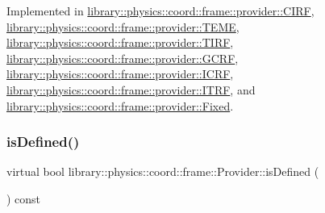 Implemented in \hyperlink{classlibrary_1_1physics_1_1coord_1_1frame_1_1provider_1_1_c_i_r_f_afa16d0f890856396364443239ceac509}{library\+::physics\+::coord\+::frame\+::provider\+::\+C\+I\+RF}, \hyperlink{classlibrary_1_1physics_1_1coord_1_1frame_1_1provider_1_1_t_e_m_e_a78bd46fa8118d7220ab16a4ca2195299}{library\+::physics\+::coord\+::frame\+::provider\+::\+T\+E\+ME}, \hyperlink{classlibrary_1_1physics_1_1coord_1_1frame_1_1provider_1_1_t_i_r_f_a89eea1b9ff4b38937bf51099e8dd6333}{library\+::physics\+::coord\+::frame\+::provider\+::\+T\+I\+RF}, \hyperlink{classlibrary_1_1physics_1_1coord_1_1frame_1_1provider_1_1_g_c_r_f_a4929dae3032a650b74b77b0d0b9bcaaa}{library\+::physics\+::coord\+::frame\+::provider\+::\+G\+C\+RF}, \hyperlink{classlibrary_1_1physics_1_1coord_1_1frame_1_1provider_1_1_i_c_r_f_a6f5256cac7e8f7b1e947a9f6627a9a33}{library\+::physics\+::coord\+::frame\+::provider\+::\+I\+C\+RF}, \hyperlink{classlibrary_1_1physics_1_1coord_1_1frame_1_1provider_1_1_i_t_r_f_a9fcd6914fa436788b84923a45fe1014e}{library\+::physics\+::coord\+::frame\+::provider\+::\+I\+T\+RF}, and \hyperlink{classlibrary_1_1physics_1_1coord_1_1frame_1_1provider_1_1_fixed_aa5c6299ec0344dbdfb94389b3d7adec5}{library\+::physics\+::coord\+::frame\+::provider\+::\+Fixed}.

\mbox{\label{classlibrary_1_1physics_1_1coord_1_1frame_1_1_provider_ae7cd093febf2b20f71400f9f79442774}} 
\subsubsection{\texorpdfstring{is\+Defined()}{isDefined()}}
{\footnotesize\ttfamily virtual bool library\+::physics\+::coord\+::frame\+::\+Provider\+::is\+Defined (\begin{DoxyParamCaption}{ }\end{DoxyParamCaption}) const\hspace{0.3cm}{\ttfamily [pure virtual]}}




